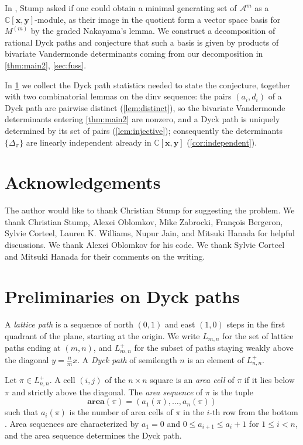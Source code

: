 \documentclass[12pt,reqno]{amsart}
\theoremstyle{definition}
\newcommand{\C}{\mathbb C}
\newcommand{\x}{\mathbf x}
\newcommand{\y}{\mathbf y}
\newcommand{\aarea}{\mathbf{area}}
\begin{document}
In \cite{MR2657714}, Stump asked if one could obtain a minimal generating set of $\mathcal{A}^m$ as a $\C[\x,\y]$-module, as their image in the quotient form a vector space basis for $M^{(m)}$ by the graded Nakayama's lemma. We construct a decomposition of rational Dyck paths and conjecture that such a basis is given by products of bivariate Vandermonde determinants coming from our decomposition in \cref{thm:main2}, \cref{sec:fuss}.

In \cref{sec:prelim} we collect the Dyck path statistics needed to state the conjecture, together with two combinatorial lemmas on the dinv sequence: the pairs $(a_i, d_i)$ of a Dyck path are pairwise distinct (\cref{lem:distinct}), so the bivariate Vandermonde determinants entering \cref{thm:main2} are nonzero, and a Dyck path is uniquely determined by its set of pairs (\cref{lem:injective}); consequently the determinants $\{\Delta_\pi\}$ are linearly independent already in $\C[\x,\y]$ (\cref{cor:independent}).

\section*{Acknowledgements}
The author would like to thank Christian Stump for suggesting the problem. We thank Christian Stump, Alexei Oblomkov, Mike Zabrocki, Fran\c{c}ois Bergeron, Sylvie Corteel, Lauren K. Williams, Nupur Jain, and Mitsuki Hanada for helpful discussions. We thank Alexei Oblomkov for his code. We thank Sylvie Corteel and Mitsuki Hanada for their comments on the writing.

\section{Preliminaries on Dyck paths}\label{sec:prelim}

A \emph{lattice path} is a sequence of north $(0,1)$ and east $(1,0)$ steps in the first quadrant of the plane, starting at the origin. We write $L_{m,n}$ for the set of lattice paths ending at $(m,n)$, and $L_{m,n}^+$ for the subset of paths staying weakly above the diagonal $y = \frac{n}{m}x$. A \emph{Dyck path} of semilength $n$ is an element of $L_{n,n}^+$.

Let $\pi \in L_{n,n}^+$. A cell $(i,j)$ of the $n \times n$ square is an \emph{area cell} of $\pi$ if it lies below $\pi$ and strictly above the diagonal. The \emph{area sequence} of $\pi$ is the tuple
\[
\aarea(\pi) = (a_1(\pi),\dots,a_n(\pi))
\]
such that $a_i(\pi)$ is the number of area cells of $\pi$ in the $i$-th row from the bottom \cite{MR2371044}. Area sequences are characterized by $a_1 = 0$ and $0 \leq a_{i+1} \leq a_i + 1$ for $1 \leq i < n$, and the area sequence determines the Dyck path.
\end{document}
